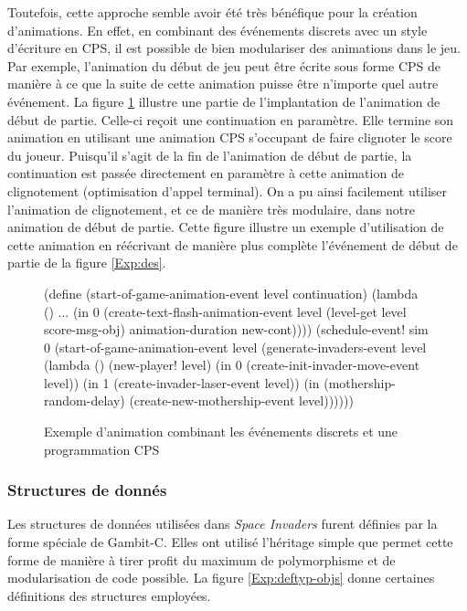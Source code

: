 \documentclass[12pt,twoside,letterpaper,francais]{book}
\newcommand{\si}{{\textit{Space Invaders }}}
\newcommand{\scheme}[1]{\selectlanguage{english}{\tt #1}\selectlanguage{french}}
\begin{document}
Toutefois, cette approche semble avoir été très bénéfique pour la
création d'animations. En effet, en combinant des événements discrets
avec un style d'écriture en CPS, il est possible de bien modulariser
des animations dans le jeu. Par exemple, l'animation du début de jeu
peut être écrite sous forme CPS de manière à ce que la suite de cette
animation puisse être n'importe quel autre événement. La figure
\ref{Exp:anim} illustre une partie de l'implantation de l'animation de
début de partie. Celle-ci reçoit une continuation en paramètre. Elle
termine son animation en utilisant une animation CPS s'occupant de
faire clignoter le score du joueur. Puisqu'il s'agit de la fin de
l'animation de début de partie, la continuation est passée directement
en paramètre à cette animation de clignotement (optimisation d'appel
terminal). On a pu ainsi facilement utiliser l'animation de
clignotement, et ce de manière très modulaire, dans notre animation de
début de partie. Cette figure illustre un exemple d'utilisation de
cette animation en réécrivant de manière plus complète l'événement de
début de partie de la figure \ref{Exp:des}.

\begin{figure}[htb!]
  \begin{schemecode}
(define (start-of-game-animation-event level continuation)
  (lambda ()
    ...
    (in 0 (create-text-flash-animation-event level
            (level-get level score-msg-obj)
            animation-duration new-cont))))
(schedule-event! sim 0
  (start-of-game-animation-event level
    (generate-invaders-event level
      (lambda ()
        (new-player! level)
        (in 0 (create-init-invader-move-event level))
        (in 1 (create-invader-laser-event level))
        (in (mothership-random-delay)
            (create-new-mothership-event level))))))
  \end{schemecode}
  \caption{Exemple d'animation combinant les événements discrets et
    une programmation CPS}
  \label{Exp:anim}
\end{figure}


\FloatBarrier
\subsubsection{Structures de donnés}
Les structures de données utilisées dans \si furent définies par la
forme spéciale \scheme{define-type} de Gambit-C. Elles ont utilisé
l'héritage simple que permet cette forme de manière à tirer profit du
maximum de polymorphisme et de modularisation de code possible. La
figure \ref{Exp:deftyp-objs} donne certaines définitions des
structures employées.
\end{document}
